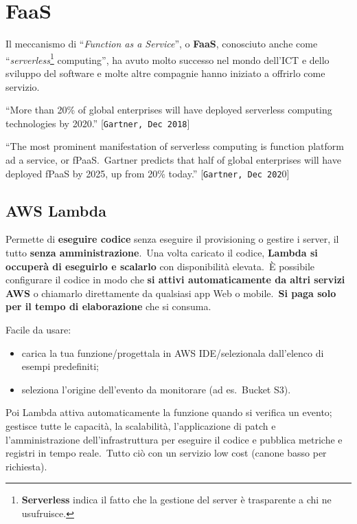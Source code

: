 \chapter{FaaS}

Il meccanismo di ``\textit{Function as a Service}'', o \textbf{FaaS}, conosciuto anche come ``\textit{serverless}\footnote{\textbf{Serverless} indica il fatto che la gestione del server è trasparente a chi ne usufruisce.} computing'', ha avuto molto successo nel mondo dell'ICT e dello sviluppo del software e molte altre compagnie hanno iniziato a offrirlo come servizio.

\vspace{12pt}
\noindent``More than 20\% of global enterprises will have deployed serverless computing technologies by 2020.'' [\texttt{Gartner, Dec 2018}]

\vspace{12pt}
\noindent``The most prominent manifestation of serverless computing is function platform ad a service, or fPaaS.\ Gartner predicts that half of global enterprises will have deployed fPaaS by 2025, up from 20\% today.'' [\texttt{Gartner, Dec 202}0]

\section{AWS Lambda}
Permette di \textbf{eseguire codice} senza eseguire il provisioning o gestire i server, il tutto \textbf{senza amministrazione}.\
Una volta caricato il codice, \textbf{Lambda si occuperà di eseguirlo e scalarlo} con disponibilità elevata.\
È possibile configurare il codice in modo che \textbf{si attivi automaticamente da altri servizi AWS} o chiamarlo direttamente da qualsiasi app Web o mobile.\
\textbf{Si paga solo per il tempo di elaborazione} che si consuma.\

\noindent Facile da usare:\
\begin{itemize}
	\item carica la tua funzione/progettala in AWS IDE/selezionala dall'elenco di esempi predefiniti;
	\item seleziona l'origine dell'evento da monitorare (ad es.\ Bucket S3).
\end{itemize}

\noindent Poi Lambda attiva automaticamente la funzione quando si verifica un evento; gestisce tutte le capacità, la scalabilità, l'applicazione di patch e l'amministrazione dell'infrastruttura per eseguire il codice e pubblica metriche e registri in tempo reale.\
Tutto ciò con un servizio low cost (canone basso per richiesta).\

